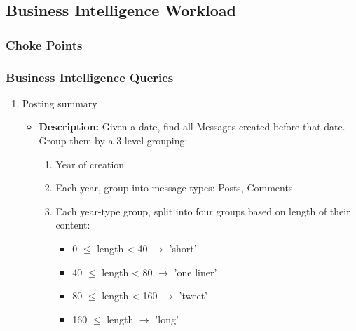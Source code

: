 
\subsection{Business Intelligence Workload}
\subsubsection{Choke Points}

\subsubsection{Business Intelligence Queries}

{\small
    \begin{enumerate}
      \item Posting summary
            \begin{itemize}
                \item \textbf{Description:}
                  Given a date, find all Messages created before that date. \\
                  Group them by a 3-level grouping: \\

                  \begin{enumerate}
                    \item Year of creation
                    \item Each year, group into message types: Posts, Comments
                    \item Each year-type group, split into four groups based on length of their content:
                          \begin{itemize}
                            \item 0 $\le$ length < 40 $\rightarrow$ 'short'
                            \item 40 $\le$ length < 80 $\rightarrow$ 'one liner'
                            \item 80 $\le$ length < 160 $\rightarrow$ 'tweet'
                            \item 160 $\le$ length $\rightarrow$ 'long'
                          \end{itemize}
                  \end{enumerate}


\end{itemize}
\end{enumerate}}
